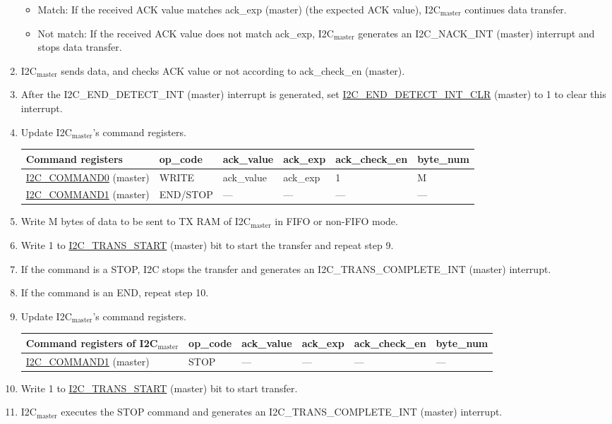 \documentclass[main\_\_EN.tex]{subfiles}
\begin{document}
\begin{enumerate}
\begin{itemize}
\item Match: If the received ACK value matches ack\_exp (master) (the expected ACK value), I2C$_\text{master}$ continues data transfer.
\item Not match: If the received ACK value does not match ack\_exp, I2C$_\text{master}$ generates an I2C\_NACK\_INT (master) interrupt and stops data transfer.
\end{itemize}
\item I2C$_\text{master}$ sends data, and checks ACK value or not according to ack\_check\_en (master).
\item After the I2C\_END\_DETECT\_INT (master) interrupt is generated, set \hyperref[fielddesc:I2CENDDETECTINTCLR]{I2C\_END\_DETECT\_INT\_CLR} (master) to 1 to clear this interrupt.
\item Update I2C$_\text{master}$'s command registers.
\begin{longtable}{ | p{5cm} | p{1.5cm} | p{1.5cm} | p{1.5cm} |p{2.5cm} | p{1.5cm} |}
\hline\rowcolor{lightgray}
Command registers& op\_code & ack\_value&ack\_exp&ack\_check\_en&byte\_num  \\ \hline
\hyperref[fielddesc:I2CCOMMAND0]{I2C\_COMMAND0} (master)& WRITE& ack\_value&ack\_exp&1&M  \\ \hline
\hyperref[fielddesc:I2CCOMMAND1]{I2C\_COMMAND1} (master)& END/STOP& ---&---&---&---  \\ \hline
\end{longtable}
\item Write M bytes of data to be sent to TX RAM of I2C$_\text{master}$ in FIFO or non-FIFO mode.
\item Write 1 to \hyperref[fielddesc:I2CTRANSSTART]{I2C\_TRANS\_START} (master) bit to start the transfer and repeat step 9.
\item If the command is a STOP, I2C stops the transfer and generates an I2C\_TRANS\_COMPLETE\_INT (master) interrupt.
\item If the command is an END, repeat step 10.
\item Update I2C$_\text{master}$'s command registers.
\begin{longtable}{ | p{5cm} | p{1.5cm} | p{1.5cm} | p{1.5cm} |p{2.5cm} | p{1.5cm} |}
\hline\rowcolor{lightgray}
Command registers of I2C$_\text{master}$& op\_code & ack\_value&ack\_exp&ack\_check\_en&byte\_num  \\ \hline
\hyperref[fielddesc:I2CCOMMAND1]{I2C\_COMMAND1} (master)& STOP& ---&---&---&---  \\ \hline
\end{longtable}
\item Write 1 to \hyperref[fielddesc:I2CTRANSSTART]{I2C\_TRANS\_START} (master) bit to start transfer.
\item I2C$_\text{master}$ executes the STOP command and generates an I2C\_TRANS\_COMPLETE\_INT (master) interrupt.
\end{enumerate}
\end{document}
